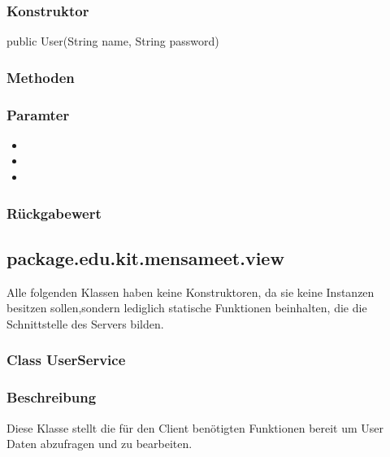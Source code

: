 \documentclass[a4paper]{scrreprt}
\begin{document}
\subsubsection*{Konstruktor}
public User(String name, String password)

\subsubsection*{Methoden}
\begin{addmargin}[25pt]{0pt}

\subsubsection*{Paramter}
\begin{itemize}
\item
\item
\item
\end{itemize}

\subsubsection*{Rückgabewert}
\end{addmargin}




\subsection{package.edu.kit.mensameet.view}

Alle folgenden Klassen haben keine Konstruktoren, da sie keine Instanzen besitzen sollen,sondern lediglich statische Funktionen beinhalten, die die Schnittstelle des Servers bilden.

\subsubsection{Class UserService}
\subsubsection*{Beschreibung}
Diese Klasse stellt die für den Client benötigten Funktionen bereit um User Daten abzufragen und zu bearbeiten. 
\end{document}
